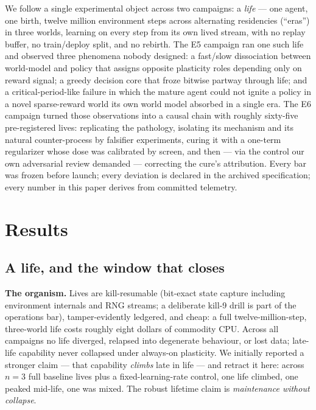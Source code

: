 \documentclass[sn-nature]{sn-jnl}
\begin{document}
We follow a single experimental object across two campaigns: a
\emph{life} --- one agent, one birth, twelve million environment steps across
alternating residencies (``eras'') in three worlds, learning on every step
from its own lived stream, with no replay buffer, no train/deploy split, and
no rebirth. The E5 campaign ran one such life and observed three phenomena
nobody designed: a fast/slow dissociation between world-model and policy
that assigns opposite plasticity roles depending only on reward signal; a
greedy decision core that froze bitwise partway through life; and a
critical-period-like failure in which the mature agent could not ignite a
policy in a novel sparse-reward world its own world model absorbed in a
single era. The E6 campaign turned those observations into a causal chain
with roughly sixty-five pre-registered lives: replicating the pathology,
isolating its mechanism and its natural counter-process by falsifier
experiments, curing it with a one-term regularizer whose dose was calibrated
by screen, and then --- via the control our own adversarial review demanded
--- correcting the cure's attribution. Every bar was frozen before launch;
every deviation is declared in the archived specification; every number in
this paper derives from committed telemetry.

\section*{Results}

\subsection*{A life, and the window that closes}

\textbf{The organism.} Lives are kill-resumable (bit-exact state capture
including environment internals and RNG streams; a deliberate kill-9 drill
is part of the operations bar), tamper-evidently ledgered, and cheap:
a full twelve-million-step, three-world life costs roughly eight dollars of
commodity CPU. Across all campaigns no life diverged, relapsed into
degenerate behaviour, or lost data; late-life capability never collapsed
under always-on plasticity. We initially reported a stronger claim --- that
capability \emph{climbs} late in life --- and retract it here: across
$n{=}3$ full baseline lives plus a fixed-learning-rate control, one life
climbed, one peaked mid-life, one was mixed. The robust lifetime claim is
\emph{maintenance without collapse}.
\end{document}

